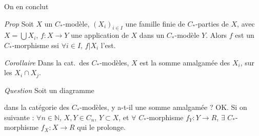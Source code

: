 \documentclass[11pt,a4paper]{article}
\begin{document}
On en conclut

\emph{Prop} Soit $X$ un $C_{*}$-modèle, $(X_i)_{i \in I}$ une famille finie
de $C_{*}$-parties de $X$, avec $X = \bigcup X_i$, $f : X \to Y$ une
application de $X$ dans un $C_{*}$-modèle $Y$. Alors $f$ est un
$C_{*}$-morphisme ssi $\forall i \in I$, $f | X_i$ l'est.

\emph{Corollaire} Dans la cat.\ des $C_{*}$-modèles, $X$ est la somme
amalgamée des $X_i$, sur les $X_i \cap X_j$.

\emph{Question} Soit un diagramme


dans la catégorie des $C_{*}$-modèles, y a-t-il une somme amalgamée ? OK.
Si on \struck{\ill{} \ill{}} 
suivante : $\forall n \in \mathbb{N}$, $X, Y \in C_n$, $Y \subset X$, et
$\forall$ $C_{*}$-morphisme $f_Y : Y \to R$, $\exists$ $C_{*}$-morphisme
$f_X : X \to R$ qui le prolonge.
\end{document}
